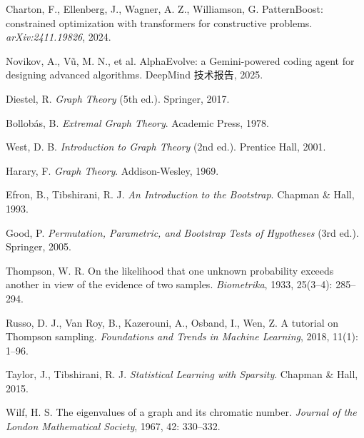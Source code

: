 \begin{sloppypar}
\begin{enumerate}[label={[\arabic*]}, leftmargin=2.6em, itemsep=3pt]
\item Charton, F., Ellenberg, J., Wagner, A. Z., Williamson, G. PatternBoost: constrained optimization with transformers for constructive problems. \emph{arXiv:2411.19826}, 2024.

\item Novikov, A., Vũ, M. N., et al. AlphaEvolve: a Gemini-powered coding agent for designing advanced algorithms. DeepMind 技术报告, 2025.

\item Diestel, R. \emph{Graph Theory} (5th ed.). Springer, 2017.

\item Bollobás, B. \emph{Extremal Graph Theory}. Academic Press, 1978.

\item West, D. B. \emph{Introduction to Graph Theory} (2nd ed.). Prentice Hall, 2001.

\item Harary, F. \emph{Graph Theory}. Addison-Wesley, 1969.

\item Efron, B., Tibshirani, R. J. \emph{An Introduction to the Bootstrap}. Chapman \& Hall, 1993.

\item Good, P. \emph{Permutation, Parametric, and Bootstrap Tests of Hypotheses} (3rd ed.). Springer, 2005.

\item Thompson, W. R. On the likelihood that one unknown probability exceeds another in view of the evidence of two samples. \emph{Biometrika}, 1933, 25(3--4): 285--294.

\item Russo, D. J., Van Roy, B., Kazerouni, A., Osband, I., Wen, Z. A tutorial on Thompson sampling. \emph{Foundations and Trends in Machine Learning}, 2018, 11(1): 1--96.

\item Taylor, J., Tibshirani, R. J. \emph{Statistical Learning with Sparsity}. Chapman \& Hall, 2015.

\item Wilf, H. S. The eigenvalues of a graph and its chromatic number. \emph{Journal of the London Mathematical Society}, 1967, 42: 330--332.

\end{enumerate}
\end{sloppypar}
